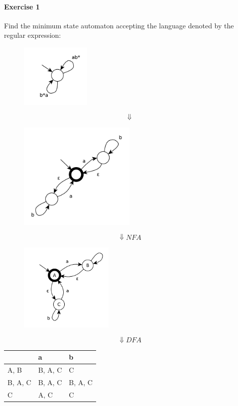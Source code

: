 \paragraph{Exercise 1}
Find the minimum state automaton accepting the language denoted by the regular expression: 
\begin{figure}[H]
    \centerline{\includegraphics[width=0.3\textwidth]{img/40.pdf}}
\end{figure}
$$
    \Downarrow
$$
\begin{figure}[H]
    \centerline{\includegraphics[width=0.5\textwidth]{img/41.pdf}}
\end{figure}
$$
    \Downarrow NFA
$$
\begin{figure}[H]
    \centerline{\includegraphics[width=0.4\textwidth]{img/42.pdf}}
\end{figure}
$$
    \Downarrow DFA
$$
\begin{table}[H]
    \centering
    \begin{tabular}{l|l|l}
        & a & b \\ \hline
        A, B & B, A, C & C \\ \hline
        B, A, C & B, A, C & B, A, C \\ \hline
        C & A, C & C \\
    \end{tabular}
\end{table}
